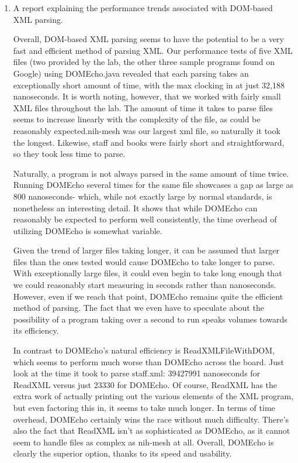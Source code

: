 \documentclass[11pt,english]{article}
\begin{document}
\begin{enumerate}
\begin{lstlisting}
\end{lstlisting}
\newpage
\item A report explaining the performance trends associated with DOM-based XML parsing.
\\
\par
Overall, DOM-based XML parsing seems to have the potential to be a very fast and efficient method of parsing XML. Our performance tests of five XML files (two provided by the lab, the other three sample programs found on Google) using DOMEcho.java revealed that each parsing takes an exceptionally short amount of time, with the max clocking in at just 32,188 nanoseconds. It is worth noting, however, that we worked with fairly small XML files throughout the lab. The amount of time it takes to parse files seems to increase linearly with the complexity of the file, as could be reasonably expected.nih-mesh was our largest xml file, so naturally it took the longest. Likewise, staff and books were fairly short and straightforward, so they took less time to parse.
\\
\par
Naturally, a program is not always parsed in the same amount of time twice. Running DOMEcho several times for the same file showcases a gap as large as 800 nanoseconds- which, while not exactly large by normal standards, is nonetheless an interesting detail. It shows that while DOMEcho can reasonably be expected to perform well consistently, the time overhead of utilizing DOMEcho is somewhat variable.
\\
\par
Given the trend of larger files taking longer, it can be assumed that larger files than the ones tested would cause DOMEcho to take longer to parse. With exceptionally large files, it could even begin to take long enough that we could reasonably start measuring in seconds rather than nanoseconds. However, even if we reach that point, DOMEcho remains quite the efficient method of parsing. The fact that we even have to speculate about the possibility of a program taking over a second to run speaks volumes towards its efficiency.
\\
\par
In contrast to DOMEcho's natural efficiency is ReadXMLFileWithDOM, which seems to perform much worse than DOMEcho across the board. Just look at the time it took to parse staff.xml: 39427991 nanoseconds for ReadXML versus just 23330 for DOMEcho. Of course, ReadXML has the extra work of actually printing out the various elements of the XML program, but even factoring this in, it seems to take much longer. In terms of time overhead, DOMEcho certainly wins the race without much difficulty. There's also the fact that ReadXML isn't as sophisticated as DOMEcho, as it cannot seem to handle files as complex as nih-mesh at all. Overall, DOMEcho is clearly the superior option, thanks to its speed and usability.

\end{enumerate}
\end{document}
